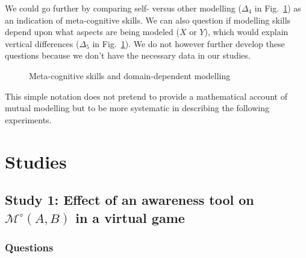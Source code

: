 \documentclass[twocolumn]{article}
\newcommand{\Model}[3]{{$\mathcal{M}^{\circ}(#1, #2, #3)$}}
\newcommand{\gModel}[2]{{$\mathcal{M}^{\circ}(#1, #2)$}}
\begin{document}
We could go further by comparing self- versus other modelling ($\Delta_4$ in
Fig.~\ref{mm_rectangle}) as an indication of meta-cognitive skills. We can also
question if modelling skills depend upon what aspects are being modeled ($X$ or $Y$),
which would explain vertical differences ($\Delta_5$ in
Fig.~\ref{mm_rectangle}). We do not however further develop these questions because we
don't have the necessary data in our studies.

\begin{figure}[htb]
\centering


\caption{\small Meta-cognitive skills and domain-dependent modelling}

\label{mm_rectangle}
\end{figure}


This simple notation does not pretend to provide a mathematical account of
mutual modelling but to be more systematic in describing the following
experiments. 





\section{Studies}



\subsection{Study 1: Effect of an awareness tool on \gModel{A}{B} in a virtual
game}

\subsubsection*{Questions}
\end{document}
